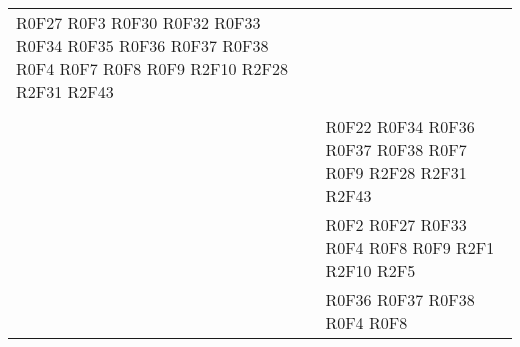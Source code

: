 \documentclass[../DefinizioneDiProdotto.tex]{subfiles}
\begin{document}
\begin{longtable}{p{8.5cm}!{\VRule[1pt]}p{2.5cm}}
R0F27 \newline 
R0F3 \newline 
R0F30 \newline 
R0F32 \newline 
R0F33 \newline 
R0F34 \newline 
R0F35 \newline 
R0F36 \newline 
R0F37 \newline 
R0F38 \newline 
R0F4 \newline 
R0F7 \newline 
R0F8 \newline 
R0F9 \newline 
R2F10 \newline 
R2F28 \newline 
R2F31 \newline 
R2F43 \\
 &  \\
 & R0F22 \newline 
R0F34 \newline 
R0F36 \newline 
R0F37 \newline 
R0F38 \newline 
R0F7 \newline 
R0F9 \newline 
R2F28 \newline 
R2F31 \newline 
R2F43 \\
 & R0F2 \newline 
R0F27 \newline 
R0F33 \newline 
R0F4 \newline 
R0F8 \newline 
R0F9 \newline 
R2F1 \newline 
R2F10 \newline 
R2F5 \\
 & R0F36 \newline 
R0F37 \newline 
R0F38 \newline 
R0F4 \newline 
R0F8 \newline 

\end{longtable}
\end{document}
